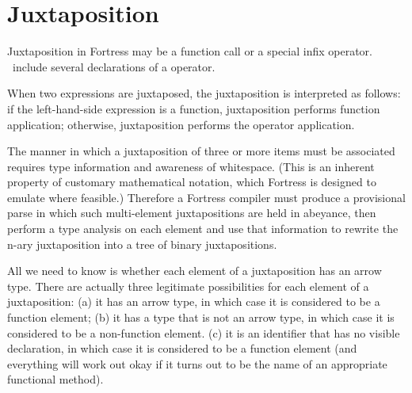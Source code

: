 %
%
%
%

\section{Juxtaposition}


Juxtaposition in Fortress may be a function call or
a special infix operator.  \Library\ include several declarations of
a  operator.

When two expressions are juxtaposed, the juxtaposition is interpreted as
follows:
if the left-hand-side expression is a function, juxtaposition performs
function application;
otherwise, juxtaposition performs the
 operator application.

The manner in which a juxtaposition of three or more items must be associated
requires type information and awareness of whitespace.  (This is an inherent property
of customary mathematical notation, which Fortress is designed to emulate where feasible.)
Therefore a Fortress compiler must produce a provisional parse in which such
multi-element juxtapositions are held in abeyance, then perform a type analysis
on each element and use that information to rewrite the n-ary juxtaposition
into a tree of binary juxtapositions.

All we need to know is whether each element of a
juxtaposition has an arrow type.
There are actually three legitimate possibilities for each element of a juxtaposition:
(a) it has an arrow type, in which case it is considered to be a function
element;
(b) it has a type that is not an arrow type, in which case it is considered
to be a non-function element.
(c) it is an identifier that has no visible declaration,
in which case it is considered to be a function element (and everything will work
out okay if it turns out to be the name of an appropriate functional method).

